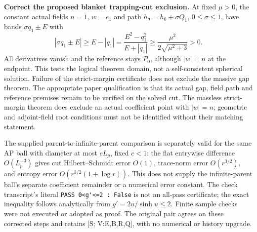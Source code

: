 \documentclass[10pt]{article}
\begin{document}
\textbf{Correct the proposed blanket trapping-cut exclusion.}
At fixed $\mu>0$, the constant actual fields $n=1$, $w=e_1$ and
path $h_\sigma=h_0+\sigma Q_1$, $0\leq\sigma\leq1$, have bands
$\sigma q_1\pm E$ with
\[
 |\sigma q_1\pm E|\geq E-|q_1|
 =\frac{E^2-q_1^2}{E+|q_1|}
 \geq\frac{\mu^2}{2\sqrt{\mu^2+3}}>0.
\]
All derivatives vanish and the reference stays $P_0$, although
$|w|=n$ at the endpoint. This tests the logical theorem domain,
not a self-consistent spherical solution. Failure of the strict-margin
certificate does not exclude the massive gap theorem. The appropriate
paper qualification is that its actual gap, field path and reference
premises remain to be verified on the solved cut. The massless
strict-margin theorem does exclude an actual coefficient point with
$|w|=n$; geometric and adjoint-field root conditions must not be
identified without their matching statement.

The supplied parent-to-infinite-parent comparison is separately valid
for the same AP ball with diameter at most $cL_p$, fixed $c<1$:
the flat entrywise difference $O(L_p^{-3})$ gives cut Hilbert--Schmidt
error $O(1)$, trace-norm error $O(r^{3/2})$, and entropy error
$O(r^{3/2}(1+\log r))$. This does not supply the infinite-parent
ball's separate coefficient remainder or a numerical error constant.
The check transcript's literal \verb|PASS 0<g'<=2 : False| is not an
all-pass certificate; the exact inequality follows analytically from
$g'=2u/\sinh u\leq2$. Finite sample checks were not executed or
adopted as proof. The original pair agrees on these corrected steps
and retains [S; V:E,B,R,Q], with no numerical or history upgrade.
\end{document}
